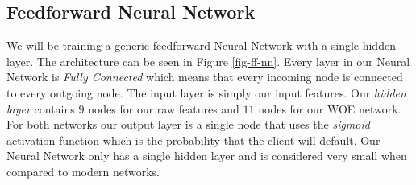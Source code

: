  \begin{table}[h!]
 \footnotesize
\begin{center}
\par\end{center}
\caption{The results of fitting a logistic regression model on the cervical cancer dataset. Shown are the features used in the model, their estimated weights and corresponding odds ratios, and the standard errors of the estimated weights. \cite{molnar2019}}\label{table:logistic}
\end{table}

\subsection{Feedforward Neural Network}
We will be training a generic feedforward Neural Network with a single hidden layer. The architecture can be seen in Figure \ref{fig-ff-nn}. Every layer in our Neural Network is \emph{Fully Connected} which means that every incoming node is connected to every outgoing node. The input layer is simply our input features. Our \emph{hidden layer} contains $9$ nodes for our raw features and $11$ nodes for our WOE network. For both networks our output layer is a single node that uses the \emph{sigmoid} activation function which is the probability that the client will default. Our Neural Network only has a single hidden layer and is considered very small when compared to modern networks.

